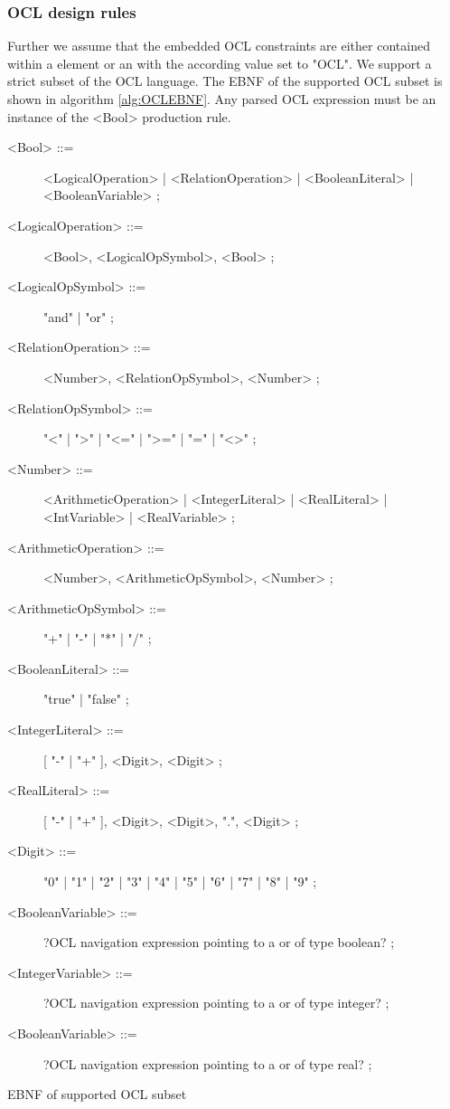 \subsubsection{OCL design rules}
Further we assume that the embedded OCL constraints are either contained within a  element or an  with the according  value set to "OCL". We support a strict subset of the OCL language. The EBNF of the supported OCL subset is shown in algorithm \ref{alg:OCLEBNF}. Any parsed OCL expression must be an instance of the <Bool> production rule.
\begin{algorithm}
\begin{description}
\item[<Bool> ::=] <LogicalOperation> | <RelationOperation> | <BooleanLiteral> | <BooleanVariable> ;
\item[<LogicalOperation> ::=] <Bool>, <LogicalOpSymbol>, <Bool> ;
\item[<LogicalOpSymbol> ::=] "and" | "or" ;
\item[<RelationOperation> ::=] <Number>, <RelationOpSymbol>, <Number> ;
\item[<RelationOpSymbol> ::=] "<" | ">" | "<=" | ">=" | "=" | "<>" ;
\item[<Number> ::=] <ArithmeticOperation> | <IntegerLiteral> | <RealLiteral> | <IntVariable> | <RealVariable> ;
\item[<ArithmeticOperation> ::=] <Number>, <ArithmeticOpSymbol>, <Number> ;
\item[<ArithmeticOpSymbol> ::=] "+" | "-" | "*" | "/" ;
\item[<BooleanLiteral> ::=] "true" | "false" ;
\item[<IntegerLiteral> ::=] [ "-" | "+" ], <Digit>, {<Digit>} ;
\item[<RealLiteral> ::=] [ "-" | "+" ], <Digit>, {<Digit>}, ".", {<Digit>} ;
\item[<Digit> ::=] "0" | "1" | "2" | "3" | "4" | "5" | "6" | "7" | "8" | "9" ;
\item[<BooleanVariable> ::=] ?OCL navigation expression pointing to a  or  of type boolean? ;
\item[<IntegerVariable> ::=] ?OCL navigation expression pointing to a  or  of type integer? ;
\item[<BooleanVariable> ::=] ?OCL navigation expression pointing to a  or  of type real? ;
\end{description}
\caption{EBNF of supported OCL subset}
\label{alg:OCLEBNF}
\end{algorithm}

